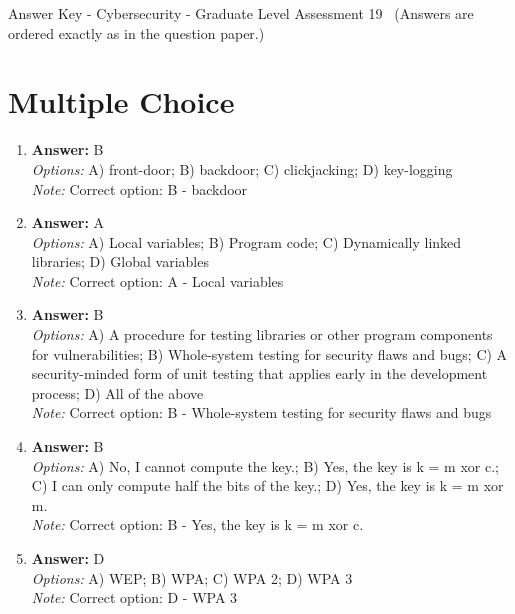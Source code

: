 \documentclass[12pt]{article}
\begin{document}
\begin{center}
Answer Key - Cybersecurity - Graduate Level Assessment 19 \
\small (Answers are ordered exactly as in the question paper.)
\end{center}

\section*{Multiple Choice}
\begin{enumerate}[label=\arabic*.]
\item \textbf{Answer:} B
\\ \textit{Options:} A) front-door; B) backdoor; C) clickjacking; D) key-logging
\\ \textit{Note:} Correct option: B - backdoor
\item \textbf{Answer:} A
\\ \textit{Options:} A) Local variables; B) Program code; C) Dynamically linked libraries; D) Global variables
\\ \textit{Note:} Correct option: A - Local variables
\item \textbf{Answer:} B
\\ \textit{Options:} A) A procedure for testing libraries or other program components for vulnerabilities; B) Whole-system testing for security flaws and bugs; C) A security-minded form of unit testing that applies early in the development process; D) All of the above
\\ \textit{Note:} Correct option: B - Whole-system testing for security flaws and bugs
\item \textbf{Answer:} B
\\ \textit{Options:} A) No, I cannot compute the key.; B) Yes, the key is k = m xor c.; C) I can only compute half the bits of the key.; D) Yes, the key is k = m xor m.
\\ \textit{Note:} Correct option: B - Yes, the key is k = m xor c.
\item \textbf{Answer:} D
\\ \textit{Options:} A) WEP; B) WPA; C) WPA 2; D) WPA 3
\\ \textit{Note:} Correct option: D - WPA 3
\end{enumerate}
\end{document}
